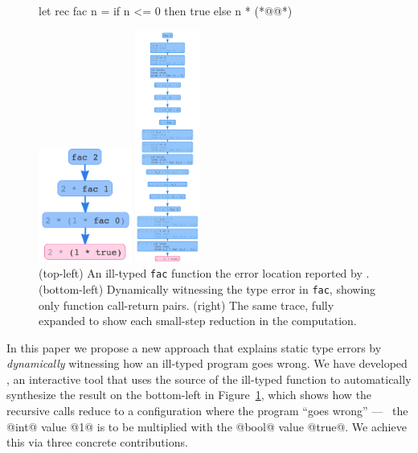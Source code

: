 \begin{figure}[t]
\centering
\begin{minipage}{.49\linewidth}
\centering
\begin{ecode}
  let rec fac n =
    if n <= 0 then
      true
    else
      n * (*@@*)
\end{ecode}
\vspace{2em}
\includegraphics[height=1.5in]{fac-overview.png}
\end{minipage}
\begin{minipage}{.49\linewidth}
\centering
\includegraphics[height=3in]{fac-long.png}
\end{minipage}
\vspace{1em}
\caption{(top-left) An ill-typed \texttt{fac} function  the error location reported by \ocaml. (bottom-left) Dynamically witnessing the type error in \texttt{fac}, showing only function call-return pairs. (right) The same trace, fully expanded to show each small-step reduction in the computation.}
\label{fig:factorial}
\end{figure}

In this paper we propose a new approach that explains
static type errors by \emph{dynamically} witnessing
how an ill-typed program goes wrong.
%
We have developed \toolname, an interactive tool that uses
the source of the ill-typed function to automatically synthesize
the result on the bottom-left in Figure~\ref{fig:factorial}, which
shows how the recursive calls reduce to a configuration where
the program ``goes wrong'' --- \ie\ the @int@ value @1@ is to be
multiplied with the @bool@ value @true@.
We achieve this via three concrete contributions.

